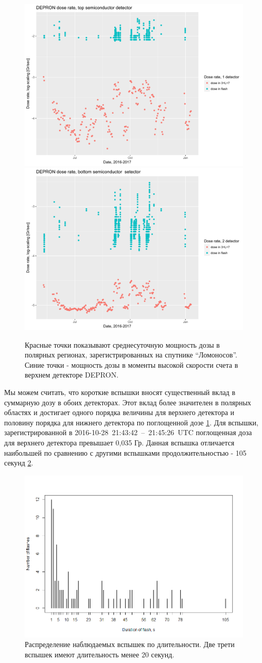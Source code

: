 \begin{figure}
	\centering
	\includegraphics[width=0.49\linewidth, trim={0 0.7cm 0 0}, clip]{images/doseanalisys/flashdose1}
	\includegraphics[width=0.49\linewidth, trim={0 0.7cm 0 0}, clip]{images/doseanalisys/flashdose2}
	\caption[Мощности дозы во время вспышек]{Красные точки показывают среднесуточную мощность дозы в полярных регионах, зарегистрированных на спутнике ``Ломоносов''. Синие точки - мощность дозы в моменты высокой скорости счета в верхнем детекторе DEPRON.}
	\label{fig:flashdose1}
\end{figure}
Мы можем считать, что короткие вспышки вносят существенный вклад в суммарную дозу в обоих детекторах. Этот вклад более значителен в полярных областях и достигает одного порядка величины для верхнего детектора и половину порядка для нижнего детектора по поглощенной дозе \ref{fig:flashdose1}.  Для вспышки, зарегистрированной в 2016-10-28~21:43:42~--~21:45:26~UTC поглощенная доза для верхнего детектора превышает 0,035 Гр. Данная вспышка отличается наибольшей по сравнению с другими вспышками продолжительностью - 105 секунд \ref{fig:rplot12}.

\begin{figure}
	\centering
	\includegraphics[width=0.7\linewidth]{images/Flash/Rplot12}
	\caption{Распределение наблюдаемых вспышек по длительности. Две трети вспышек имеют длительность менее 20 секунд.}
	\label{fig:rplot12}
\end{figure}




